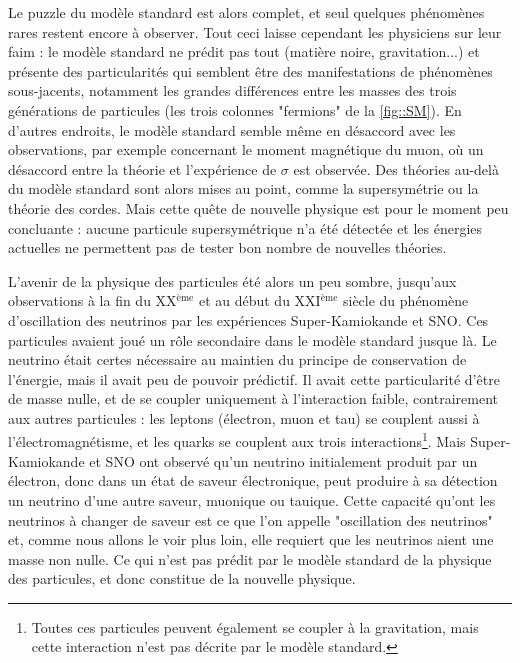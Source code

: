 		    Le puzzle du modèle standard est alors complet, et seul quelques phénomènes rares restent encore à observer. Tout ceci laisse cependant les physiciens sur leur faim : le modèle standard ne prédit pas tout (matière noire, gravitation...) et présente des particularités qui semblent être des manifestations de phénomènes sous-jacents, notamment les grandes différences entre les masses des trois générations de particules (les trois colonnes "fermions" de la \autoref{fig::SM}). En d'autres endroits, le modèle standard semble même en désaccord avec les observations, par exemple concernant le moment magnétique du muon, où un désaccord entre la théorie et l'expérience de $\sigma$ est observée\cite{pdg2018}. Des théories au-delà du modèle standard sont alors mises au point, comme la supersymétrie ou la théorie des cordes\cite{pdg2018}. Mais cette quête de nouvelle physique est pour le moment peu concluante : aucune particule supersymétrique n'a été détectée et les énergies actuelles ne permettent pas de tester bon nombre de nouvelles théories.
		    
		    L'avenir de la physique des particules été alors un peu sombre, jusqu'aux observations à la fin du XX$^{\text{ème}}$ et au début du XXI$^{\text{ème}}$ siècle du phénomène d'oscillation des neutrinos par les expériences Super-Kamiokande\cite{Fukuda1998} et SNO\cite{Aharmim2013}. Ces particules avaient joué un rôle secondaire dans le modèle standard jusque là. Le neutrino était certes nécessaire au maintien du principe de conservation de l'énergie, mais il avait peu de pouvoir prédictif. Il avait cette particularité d'être de masse nulle, et de se coupler uniquement à l'interaction faible, contrairement aux autres particules : les leptons (électron, muon et tau) se couplent aussi à l'électromagnétisme, et les quarks se couplent aux trois interactions\footnote{Toutes ces particules peuvent également se coupler à la gravitation, mais cette interaction n'est pas décrite par le modèle standard.}. Mais Super-Kamiokande et SNO ont observé qu'un neutrino initialement produit par un électron, donc dans un état de saveur électronique, peut produire à sa détection un neutrino d'une autre saveur, muonique ou tauique. Cette capacité qu'ont les neutrinos à changer de saveur est ce que l'on appelle "oscillation des neutrinos" et, comme nous allons le voir plus loin, elle requiert que les neutrinos aient une masse non nulle. Ce qui n'est pas prédit par le modèle standard de la physique des particules, et donc constitue de la nouvelle physique.
		    
